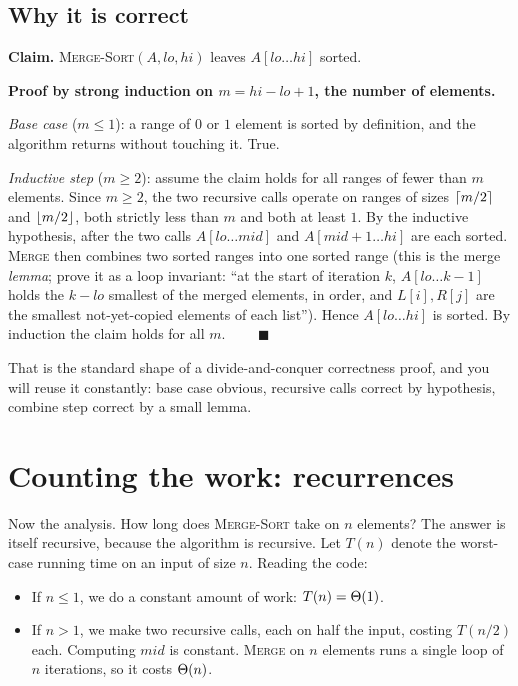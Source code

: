 \subsection{Why it is correct}

\begin{formalbox}
\textbf{Claim.} \textsc{Merge-Sort}$(A, lo, hi)$ leaves $A[lo\ldots hi]$ sorted.

\textbf{Proof by strong induction on $m = hi - lo + 1$, the number of elements.}

\emph{Base case} ($m \le 1$): a range of $0$ or $1$ element is sorted by
definition, and the algorithm returns without touching it. True.

\emph{Inductive step} ($m \ge 2$): assume the claim holds for all ranges of fewer
than $m$ elements. Since $m \ge 2$, the two recursive calls operate on ranges of
sizes $\lceil m/2\rceil$ and $\lfloor m/2\rfloor$, both strictly less than $m$ and both at
least $1$. By the inductive hypothesis, after the two calls $A[lo\ldots mid]$ and
$A[mid+1\ldots hi]$ are each sorted. \textsc{Merge} then combines two sorted
ranges into one sorted range (this is the merge \emph{lemma}; prove it as a loop
invariant: ``at the start of iteration $k$, $A[lo\ldots k-1]$ holds the $k-lo$
smallest of the merged elements, in order, and $L[i], R[j]$ are the smallest
not-yet-copied elements of each list''). Hence $A[lo\ldots hi]$ is sorted.
By induction the claim holds for all $m$. $\qquad\blacksquare$
\end{formalbox}

That is the standard shape of a divide-and-conquer correctness proof, and you will
reuse it constantly: base case obvious, recursive calls correct by hypothesis,
combine step correct by a small lemma.

\section{Counting the work: recurrences}

Now the analysis. How long does \textsc{Merge-Sort} take on $n$ elements? The
answer is itself recursive, because the algorithm is recursive. Let $T(n)$
denote the worst-case running time on an input of size $n$. Reading the code:

\begin{itemize}
\item If $n \le 1$, we do a constant amount of work: $T(n) = \Theta(1)$.
\item If $n > 1$, we make two recursive calls, each on half the input, costing
      $T(n/2)$ each. Computing $mid$ is constant. \textsc{Merge} on $n$ elements
      runs a single loop of $n$ iterations, so it costs $\Theta(n)$.
\end{itemize}

